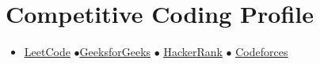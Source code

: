 \documentclass[]{resume-openfont}
\begin{document}
\section{Competitive Coding Profile}
\begin{itemize}
    \item \href{https://leetcode.com/kanthreddygaddamchandra/}{\underline{LeetCode}} $\bullet$\href{https://auth.geeksforgeeks.org/user/chand17/practice/}{\underline{GeeksforGeeks}}  $\bullet$ \href{https://www.hackerrank.com/chandu_stinsfire}{\underline{HackerRank}}  $\bullet$  \href{https://codeforces.com/profile/chand_stinsy}{\underline{Codeforces}}
    
\end{itemize}
\end{document}

